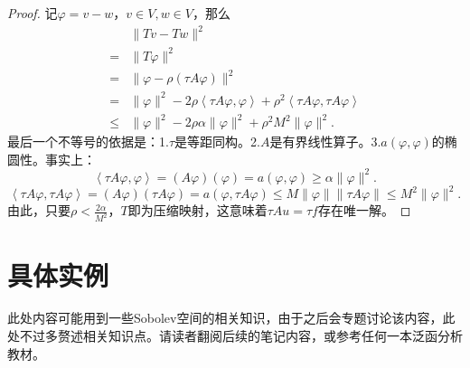 \documentclass[lang=cn,10pt,newtx]{elegantbook}
\newcommand{\innerprod}[2]{\left<#1,#2\right>}
\newcommand{\norm}[1]{\|#1\|}
\begin{document}
\begin{proof}
  记$\varphi=v-w$，$v\in V,w\in V$，那么
  \begin{equation}
    \begin{aligned}
      &\norm{Tv-Tw}^{2}\\
      =&\norm{T\varphi}^{2}\\
      =&\norm{\varphi-\rho(\tau A\varphi)}^{2}\\
      =&\norm{\varphi}^{2}-2\rho\innerprod{\tau A\varphi}{\varphi}+\rho^{2}\innerprod{\tau A\varphi}{\tau A\varphi}\\
      \le& \norm{\varphi}^2-2\rho\alpha\norm{\varphi}^{2}+\rho^{2}M^{2}\norm{\varphi}^{2}.
    \end{aligned}
  \end{equation}
  最后一个不等号的依据是：1.$\tau$是等距同构。2.$A$是有界线性算子。3.$a(\varphi,\varphi)$的椭圆性。事实上：
  \begin{equation}
    \innerprod{\tau A\varphi}{\varphi}=(A\varphi)(\varphi)=a(\varphi,\varphi)\ge \alpha\norm{\varphi}^{2}.
  \end{equation}
  \begin{equation}
    \innerprod{\tau A\varphi}{\tau A\varphi}=(A\varphi)(\tau A\varphi)=a(\varphi,\tau A\varphi)\le M\norm{\varphi}\norm{\tau A\varphi}\le M^{2}\norm{\varphi}^{2}.
  \end{equation}
  由此，只要$\rho<\frac{2\alpha}{M^{2}}$，$T$即为压缩映射，这意味着$\tau Au=\tau f$存在唯一解。
\end{proof}
\section{具体实例}
\begin{remark}
  此处内容可能用到一些Sobolev空间的相关知识，由于之后会专题讨论该内容，此处不过多赘述相关知识点。请读者翻阅后续的笔记内容，或参考任何一本泛函分析教材。
\end{remark}
\end{document}
